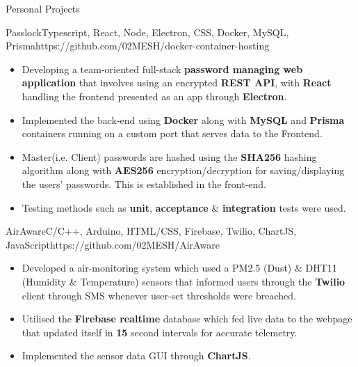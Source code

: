 \documentclass[11pt]{article}
\newlength{\secsep}
\newlength{\seperate}
\newcommand{\coloredhrulefill}[2][black]{%
    \leavevmode%
    \leaders\hbox{\textcolor{#1}{\rule{1ex}{0.5pt}}}\hfill\kern0pt%
}
\newcommand{\lineunder}{\vspace*{-24pt} \hspace*{-6pt} \coloredhrulefill[contactgrey]{}  \\* \vspace*{-15pt}}
\newenvironment{tabbedList}[1]{
	\begin{list}{}{
      \setlength{\itemsep}{0pt}
      \setlength{\labelsep}{0pt}
      \setlength{\labelwidth}{0pt}
      \setlength{\leftmargin}{10pt}
      \setlength{\rightmargin}{0pt}
      \setlength{\listparindent}{0pt}
      \setlength{\parsep}{0pt}
      \setlength{\parskip}{0pt}
      \setlength{\partopsep}{0pt}
      \setlength{\topsep}{#1}
	}
	\item[]
}{\end{list}}
\newenvironment{resume_section}[1] {
	\textsc{\Large #1} \\*
	
	\lineunder
	\begin{tabbedList}{\secsep}
}{\end{tabbedList}\vspace{1.2\secsep}}
\newenvironment{personal_projects}[4] {
	\textbf{#1} \href{#4}{#3} $\mid$ {\scriptsize #2}  %
	\vspace*{4px}
	\begin{tabbedList}{0pt}
}{\end{tabbedList}\vspace*{1.5\secsep}}
\newenvironment{subitems}{
	\vspace*{-2px}
	\begin{itemize}[left=2pt]
		\setlength{\labelsep}{0.3em}
		\setlength{\itemsep}{0pt}
		\setlength{\parsep}{0pt}
		\setlength{\topsep}{0px}
}{\end{itemize}}
\begin{document}
	\begin{resume_section}{Personal Projects}
	
		\begin{personal_projects} {Passlock}{Typescript, React, Node, Electron, CSS, Docker, MySQL, Prisma}{\faGitlab}{https://github.com/02MESH/docker-container-hosting}
			\begin{subitems}
				\item{Developing a team-oriented full-stack \textbf{password managing web application} that involves using an encrypted \textbf{REST API}, with \textbf{React} handling the frontend presented as an app through \textbf{Electron}.}
				\item{Implemented the back-end using \textbf{Docker} along with \textbf{MySQL} and \textbf{Prisma} containers running on a custom port that serves data to the Frontend.}
				\item{Master(i.e. Client) passwords are hashed using the \textbf{SHA256} hashing algorithm along with \textbf{AES256} encryption/decryption for saving/displaying the users' passwords. This is established in the front-end.}
				\item{Testing methods such as \textbf{unit}, \textbf{acceptance} \& \textbf{integration} tests were used.}
			\end{subitems}
		\end{personal_projects}	
	
		\vspace*{\seperate}
		
		\begin{personal_projects}{AirAware}{C/C++, Arduino, HTML/CSS, Firebase, Twilio, ChartJS, JavaScript}{\faGithub}{https://github.com/02MESH/AirAware}
			\begin{subitems}
				\item{Developed a air-monitoring system which used a PM2.5 (Dust) \& DHT11 (Humidity \& Temperature) sensors that informed users through the \textbf{Twilio} client through SMS whenever user-set thresholds were breached.}
				\item{Utilised the \textbf{Firebase realtime} database which fed live data to the webpage that updated itself in \textbf{15} second intervals for accurate telemetry.}
				\item{Implemented the sensor data GUI through \textbf{ChartJS}.}
			\end{subitems}
		\end{personal_projects}
			
		\vspace*{\seperate}			
			

\end{resume_section}
\end{document}

